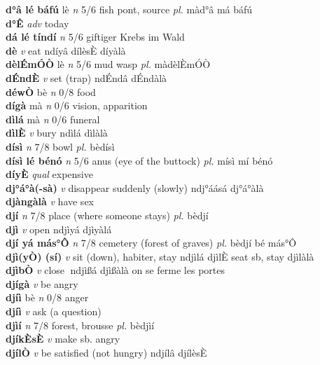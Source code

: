 \documentclass{article}
\begin{document}
{\bf d°â lé báfú} lè {\it n} 5/6 fish pont, source {\it pl.} màd°â má báfú         \\ 
{\bf d°Ê}  {\it adv} today         \\ 
{\bf dá lé tíndí}  {\it n} 5/6 giftiger Krebs im Wald         \\ 
{\bf dè}  {\it v} eat   ndíyâ  dílèsÈ díyàlà   \\ 
{\bf dèlÉmÓÒ} lè {\it n} 5/6 mud wasp {\it pl.} màdèlÈmÓÒ         \\ 
{\bf dÉndÈ}  {\it v} set (trap)   ndÉndâ   dÉndàlà   \\ 
{\bf déwÒ} bè {\it n} 0/8 food         \\ 
{\bf dígà} mà {\it n} 0/6 vision, apparition         \\ 
{\bf dìlá} mà {\it n} 0/6 funeral         \\ 
{\bf dìlÈ}  {\it v} bury   ndìlá   dìlàlà   \\ 
{\bf dísì}  {\it n} 7/8 bowl {\it pl.} bèdísì         \\ 
{\bf dísì lé bénó}  {\it n} 5/6 anus (eye of the buttock) {\it pl.} mísì mí bénó         \\ 
{\bf díyÈ}  {\it qual} expensive         \\ 
{\bf dj°á°à(-sà)}  {\it v} disappear suddenly (slowly)   ndj°áásá   dj°á°àlà   \\ 
{\bf djàngàlà}  {\it v} have sex         \\ 
{\bf djí}  {\it n} 7/8 place (where someone stays) {\it pl.} bèdjí         \\ 
{\bf djì}  {\it v} open   ndjìyá   djìyàlá   \\ 
{\bf djí yá más°Ô}  {\it n} 7/8 cemetery (forest of graves) {\it pl.} bèdjí bé más°Ô         \\ 
{\bf djì(yÒ) (sí)}  {\it v} sit (down), habiter, stay   ndjìlá djìlÈ seat sb, stay  djìlàlà   \\ 
{\bf djìbÒ}  {\it v} close   ndjìßá   djìßàlà on se ferme les portes   \\ 
{\bf djígà}  {\it v} be angry         \\ 
{\bf djíì} bè {\it n} 0/8 anger         \\ 
{\bf djíì}  {\it v} ask (a question)         \\ 
{\bf djìí}  {\it n} 7/8 forest, brousse {\it pl.} bèdjìí         \\ 
{\bf djíkÈsÈ}  {\it v} make sb. angry         \\ 
{\bf djílÒ}  {\it v} be satisfied (not hungry)   ndjílâ  djílèsÈ    \\ 
\end{document}
